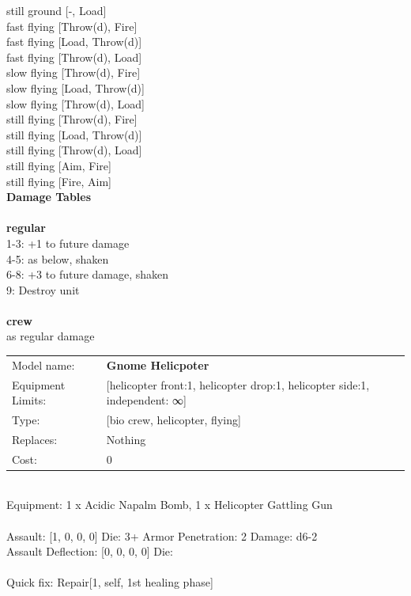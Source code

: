 still ground [-, Load] \\
fast flying [Throw(d), Fire] \\
fast flying [Load, Throw(d)] \\
fast flying [Throw(d), Load] \\
slow flying [Throw(d), Fire] \\
slow flying [Load, Throw(d)] \\
slow flying [Throw(d), Load] \\
still flying [Throw(d), Fire] \\
still flying [Load, Throw(d)] \\
still flying [Throw(d), Load] \\
still flying [Aim, Fire] \\
still flying [Fire, Aim] \\


{\bf Damage Tables} \\
\ \\ {\bf regular } \\
1-3: +1 to future damage \\
4-5: as below, shaken \\
6-8: +3 to future damage, shaken \\
9: Destroy unit \\
\ \\ {\bf crew } \\
as regular damage \\


\noindent
\begin{tabular}{ll}
Model name: &{\bf Gnome Helicpoter } \\
Equipment Limits: &[helicopter front:1, helicopter drop:1, helicopter side:1, independent: ∞] \\
Type: &[bio crew, helicopter, flying] \\
Replaces: &Nothing \\
Cost: & 0\\
\end{tabular}
\ \\
Equipment: 1 x Acidic Napalm Bomb, 1 x Helicopter Gattling Gun \\
\ \\
Assault: [1, 0, 0, 0] Die: 3+ Armor Penetration: 2 Damage: d6-2 \\
Assault Deflection: [0, 0, 0, 0] Die: \\
\indent  
\ \\
Quick fix: Repair[1, self, 1st healing phase]\\ 

